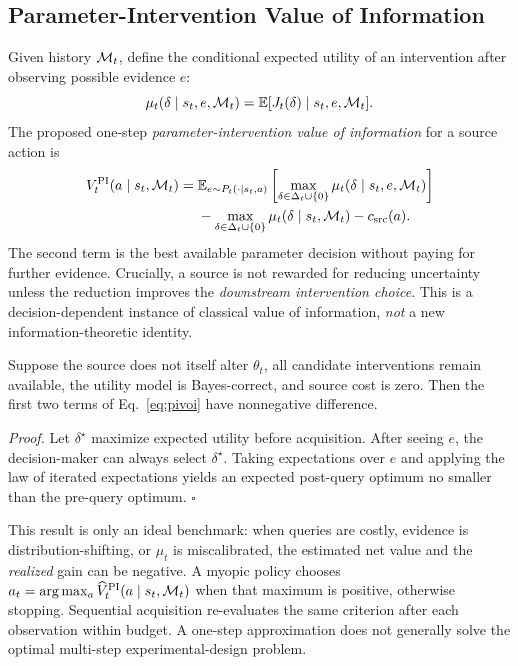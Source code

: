 \subsection{Parameter-Intervention Value of Information}
\label{sec:pivoi}
Given history $\mathcal{M}_t$, define the conditional expected utility of
an intervention after observing possible evidence $e$:
\begin{equation}
\mu_t(\delta\mid s_t,e,\mathcal{M}_t)
=\mathbb{E}[J_t(\delta)\mid s_t,e,\mathcal{M}_t].
\label{eq:mu}
\end{equation}
The proposed one-step \emph{parameter-intervention value of
information} for a source action is
\begin{align}
V^{\rm PI}_t(a\mid s_t,\mathcal{M}_t)
={}&\mathbb{E}_{e\sim P_t(\cdot\mid s_t,a)}
  \left[
  \max_{\delta\in\Delta_t\cup\{0\}}
  \mu_t(\delta\mid s_t,e,\mathcal{M}_t)
  \right]\nonumber\\
 &-\max_{\delta\in\Delta_t\cup\{0\}}
  \mu_t(\delta\mid s_t,\mathcal{M}_t)
  -c_{\rm src}(a).
\label{eq:pivoi}
\end{align}
The second term is the best available parameter decision without
paying for further evidence. Crucially, a source is not rewarded
for reducing uncertainty unless the reduction improves the
\emph{downstream intervention choice}. This is a decision-dependent
instance of classical value of information, \emph{not} a new
information-theoretic identity.

\begin{proposition}
\label{prop:voi}
Suppose the source does not itself alter $\theta_t$, all candidate
interventions remain available, the utility model is Bayes-correct,
and source cost is zero. Then the first two terms of
Eq.~\eqref{eq:pivoi} have nonnegative difference.
\end{proposition}
\noindent\textit{Proof.}
Let $\delta^\star$ maximize expected utility before acquisition.
After seeing $e$, the decision-maker can always select
$\delta^\star$. Taking expectations over $e$ and applying the law
of iterated expectations yields an expected post-query optimum
no smaller than the pre-query optimum. \hfill$\square$

This result is only an ideal benchmark: when queries are costly,
evidence is distribution-shifting, or $\mu_t$ is miscalibrated,
the estimated net value and the \emph{realized} gain can be negative.
A myopic policy chooses
$a_t=\arg\max_a\widehat V^{\rm PI}_t(a\mid s_t,\mathcal{M}_t)$
when that maximum is positive, otherwise stopping.
Sequential acquisition re-evaluates the same criterion after each
observation within budget. A one-step approximation does not
generally solve the optimal multi-step experimental-design problem.

